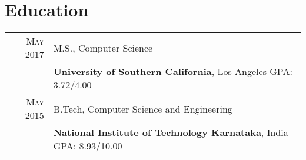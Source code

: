 \section{Education}
\begin{tabular}{rl}

\textsc{May 2017} & M.S., Computer Science\\
&\textbf{University of Southern California}, Los Angeles\hspace{2.8cm} GPA: 3.72/4.00
\\
\textsc{May 2015} & B.Tech, Computer Science and Engineering \\
&\textbf{National Institute of Technology Karnataka}, India\hspace{2cm} GPA: 8.93/10.00

\end{tabular}
\vspace{5pt}

